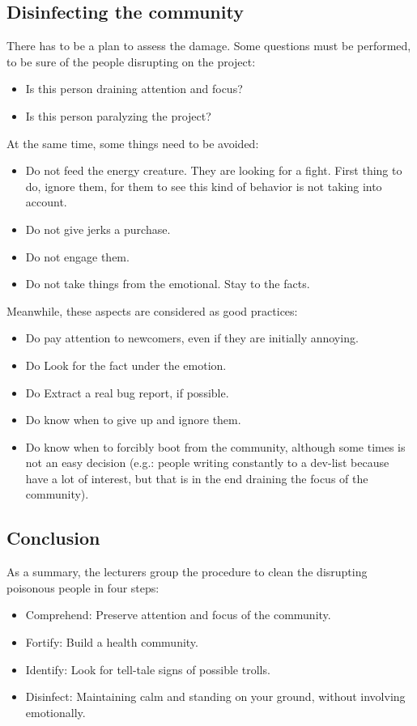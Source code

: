 \documentclass[11pt]{article}
\begin{document}
\subsection{Disinfecting the community}
There has to be a plan to assess the damage. Some questions must be performed, to be sure of the people disrupting on the project:
\begin{itemize}\itemsep0pt
\item{Is this person draining attention and focus?}
\item{Is this person paralyzing the project?}
\end{itemize}
At the same time, some things need to be avoided:
\begin{itemize}\itemsep0pt
\item{Do not feed the energy creature. They are looking for a fight. First thing to do, ignore them, for them to see this kind of behavior is not taking into account.}
\item{Do not give jerks a purchase.}
\item{Do not engage them.}
\item{Do not take things from the emotional. Stay to the facts.}
\end{itemize}
Meanwhile, these aspects are considered as good practices:
\begin{itemize}\itemsep0pt
\item{Do pay attention to newcomers, even if they are initially annoying.}
\item{Do Look for the fact under the emotion.}
\item{Do Extract a real bug report, if possible.}
\item{Do know when to give up and ignore them.}
\item{Do know when to forcibly boot from the community, although some times is not an easy decision (e.g.: people writing constantly to a dev-list because have a lot of interest, but that is in the end draining the focus of the community).}
\end{itemize}

\subsection{Conclusion}
As a summary, the lecturers group the procedure to clean the disrupting poisonous people in four steps:
\begin{itemize}\itemsep0pt
\item{Comprehend}: Preserve attention and focus of the community.
\item{Fortify}: Build a health community.
\item{Identify}: Look for tell-tale signs of possible trolls.
\item{Disinfect}: Maintaining calm and standing on your ground, without involving emotionally.
\end{itemize}
\end{document}
